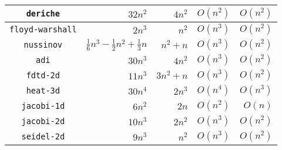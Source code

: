 \documentclass{article}
\begin{document}
\begin{table}
\begin{tabu}{|c|r|r|r|r|}
\hline
{\tt deriche} & $32n^2$ & $4n^2$ & $O(n^2)$ & $O(n^2)$\\
\hline
{\tt floyd-warshall} & $2n^3$ & $n^2$ & $O(n^3)$ & $O(n^2)$\\
\hline
{\tt nussinov} & $\frac{1}{6}n^3 - \frac{1}{2}n^2 + \frac{1}{3}n$ & $n^2+n$ & $O(n^3)$ & $O(n^2)$\\
\hline
{\tt adi} & $30n^3$ & $4n^2$ & $O(n^3)$ & $O(n^2)$\\
\hline
{\tt fdtd-2d} & $11n^3$ & $3n^2+n$ & $O(n^3)$ & $O(n^2)$\\
\hline
{\tt heat-3d} & $30n^4$ & $2n^3$ & $O(n^4)$ & $O(n^3)$\\
\hline
{\tt jacobi-1d} & $6n^2$ & $2n$ & $O(n^2)$ & $O(n)$\\
\hline
{\tt jacobi-2d} & $10n^3$ & $2n^2$ & $O(n^3)$ & $O(n^2)$\\
\hline
{\tt seidel-2d} & $9n^3$ & $n^2$ & $O(n^3)$ & $O(n^2)$\\
\hline
\end{tabu}
\end{table}



\end{document}
